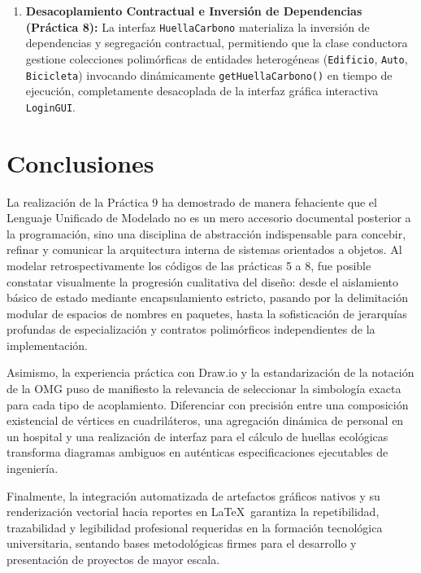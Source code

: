 \documentclass[letterpaper,12pt,oneside]{article}
\numberwithin{figure}{section}
\begin{document}
\begin{enumerate}
    \item \textbf{Desacoplamiento Contractual e Inversi\'on de Dependencias (Pr\'actica 8):} La interfaz \texttt{HuellaCarbono} materializa la inversi\'on de dependencias y segregaci\'on contractual, permitiendo que la clase conductora gestione colecciones polim\'orficas de entidades heterog\'eneas (\texttt{Edificio}, \texttt{Auto}, \texttt{Bicicleta}) invocando din\'amicamente \texttt{getHuellaCarbono()} en tiempo de ejecuci\'on, completamente desacoplada de la interfaz gr\'afica interactiva \texttt{LoginGUI}.
\end{enumerate}


\clearpage
\section{Conclusiones}
La realizaci\'on de la Pr\'actica 9 ha demostrado de manera fehaciente que el Lenguaje Unificado de Modelado no es un mero accesorio documental posterior a la programaci\'on, sino una disciplina de abstracci\'on indispensable para concebir, refinar y comunicar la arquitectura interna de sistemas orientados a objetos. Al modelar retrospectivamente los c\'odigos de las pr\'acticas 5 a 8, fue posible constatar visualmente la progresi\'on cualitativa del dise\~no: desde el aislamiento b\'asico de estado mediante encapsulamiento estricto, pasando por la delimitaci\'on modular de espacios de nombres en paquetes, hasta la sofisticaci\'on de jerarqu\'ias profundas de especializaci\'on y contratos polim\'orficos independientes de la implementaci\'on.

Asimismo, la experiencia pr\'actica con Draw.io y la estandarizaci\'on de la notaci\'on de la OMG puso de manifiesto la relevancia de seleccionar la simbolog\'ia exacta para cada tipo de acoplamiento. Diferenciar con precisi\'on entre una composici\'on existencial de v\'ertices en cuadril\'ateros, una agregaci\'on din\'amica de personal en un hospital y una realizaci\'on de interfaz para el c\'alculo de huellas ecol\'ogicas transforma diagramas ambiguos en aut\'enticas especificaciones ejecutables de ingenier\'ia.

Finalmente, la integraci\'on automatizada de artefactos gr\'aficos nativos y su renderizaci\'on vectorial hacia reportes en \LaTeX\ garantiza la repetibilidad, trazabilidad y legibilidad profesional requeridas en la formaci\'on tecnol\'ogica universitaria, sentando bases metodol\'ogicas firmes para el desarrollo y presentaci\'on de proyectos de mayor escala.
\end{document}

